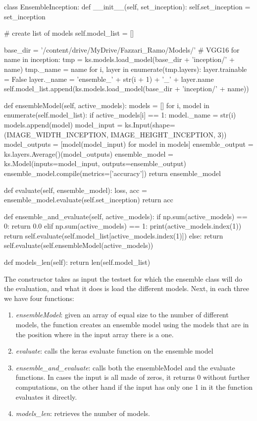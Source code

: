 \begin{python}
class EnsembleInception:
    def __init__(self, set_inception):
        self.set_inception = set_inception

        # create list of models
        self.model_list = []

        base_dir = '/content/drive/MyDrive/Fazzari_Ramo/Models/'
        # VGG16
        for name in inception:
            tmp = ks.models.load_model(base_dir + 'inception/' + name)
            tmp._name = name
            for i, layer in enumerate(tmp.layers):
                layer.trainable = False
                layer._name = 'ensemble_' + str(i + 1) + '_' + layer.name
            self.model_list.append(ks.models.load_model(base_dir + 'inception/' + name))


    def ensembleModel(self, active_models):
        models = []
        for i, model in enumerate(self.model_list):
            if active_models[i] == 1:
                model._name = str(i)
                models.append(model)
        model_input = ks.Input(shape=(IMAGE_WIDTH_INCEPTION, IMAGE_HEIGHT_INCEPTION, 3))
        model_outputs = [model(model_input) for model in models]
        ensemble_output = ks.layers.Average()(model_outputs)
        ensemble_model = ks.Model(inputs=model_input, outputs=ensemble_output)
        ensemble_model.compile(metrics=['accuracy'])
        return ensemble_model

    def evaluate(self, ensemble_model):
        loss, acc = ensemble_model.evaluate(self.set_inception)
        return acc

    def ensemble_and_evaluate(self, active_models):
        if np.sum(active_models) == 0:
            return 0.0
        elif np.sum(active_models) == 1:
            print(active_models.index(1))
            return self.evaluate(self.model_list[active_models.index(1)])
        else:
            return self.evaluate(self.ensembleModel(active_models))

    def models_len(self):
        return len(self.model_list)
\end{python}

The constructor takes as input the testset for which the ensemble class will do the evaluation, and what it does is load the different models. Next, in each three we have four functions:

\begin{enumerate}
	\item \textit{ensembleModel}: given an array of equal size to the number of different models, the function creates an ensemble model using the models that are in the position where in the input array there is a one.
	\item \textit{evaluate}: calls the keras evaluate function on the ensemble model
	\item \textit{ensemble\_and\_evaluate}: calls both the ensembleModel and the evaluate functions. In cases the input is all made of zeros, it returns 0 without further computations, on the other hand if the input has only one 1 in it the function evaluates it directly.
	\item \textit{models\_len}: retrieves the number of models.
\end{enumerate}

